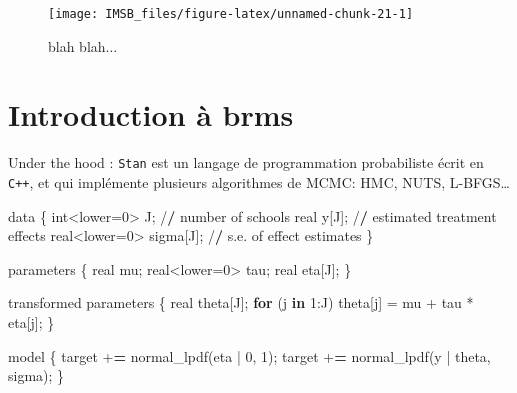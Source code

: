 \documentclass[
  a4paper,11pt,twoside,onecolumn,openright,final,oldfontcommands]{memoir}
\newenvironment{Shaded}{\begin{snugshade}}{\end{snugshade}}
\newcommand{\ControlFlowTok}[1]{\textcolor[rgb]{0.13,0.29,0.53}{\textbf{#1}}}
\newcommand{\DecValTok}[1]{\textcolor[rgb]{0.00,0.00,0.81}{#1}}
\newcommand{\ErrorTok}[1]{\textcolor[rgb]{0.64,0.00,0.00}{\textbf{#1}}}
\newcommand{\FunctionTok}[1]{\textcolor[rgb]{0.00,0.00,0.00}{#1}}
\newcommand{\NormalTok}[1]{#1}
\newcommand{\OtherTok}[1]{\textcolor[rgb]{0.56,0.35,0.01}{#1}}
\newcommand{\SpecialCharTok}[1]{\textcolor[rgb]{0.00,0.00,0.00}{#1}}
\theoremstyle{definition}
\theoremstyle{definition}
\theoremstyle{definition}
\theoremstyle{definition}
\theoremstyle{remark}
\begin{document}
\begin{figure}[!htb]

{\centering \texttt{[image: IMSB\_files/figure-latex/unnamed-chunk-21-1]} 

}

\caption{blah blah...}\label{fig:unnamed-chunk-21}
\end{figure}

\hypertarget{introduction-uxe0-brms}{%
\section{Introduction à brms}\label{introduction-uxe0-brms}}

Under the hood : \texttt{Stan} est un langage de programmation probabiliste écrit en \texttt{C++}, et qui implémente plusieurs algorithmes de MCMC: HMC, NUTS, L-BFGS\ldots{}

\begin{Shaded}
\begin{Highlighting}[]
\NormalTok{data \{}
\NormalTok{  int}\SpecialCharTok{\textless{}}\NormalTok{lower}\OtherTok{=}\DecValTok{0}\SpecialCharTok{\textgreater{}}\NormalTok{ J; }\SpecialCharTok{/}\ErrorTok{/}\NormalTok{ number of schools }
\NormalTok{  real y[J]; }\SpecialCharTok{/}\ErrorTok{/}\NormalTok{ estimated treatment effects}
\NormalTok{  real}\SpecialCharTok{\textless{}}\NormalTok{lower}\OtherTok{=}\DecValTok{0}\SpecialCharTok{\textgreater{}}\NormalTok{ sigma[J]; }\SpecialCharTok{/}\ErrorTok{/}\NormalTok{ s.e. of effect estimates }
\NormalTok{\}}

\NormalTok{parameters \{}
\NormalTok{  real mu; }
\NormalTok{  real}\SpecialCharTok{\textless{}}\NormalTok{lower}\OtherTok{=}\DecValTok{0}\SpecialCharTok{\textgreater{}}\NormalTok{ tau;}
\NormalTok{  real eta[J];}
\NormalTok{\}}

\NormalTok{transformed parameters \{}
\NormalTok{  real theta[J];}
  \ControlFlowTok{for}\NormalTok{ (j }\ControlFlowTok{in} \DecValTok{1}\SpecialCharTok{:}\NormalTok{J)}
\NormalTok{    theta[j] }\OtherTok{=}\NormalTok{ mu }\SpecialCharTok{+}\NormalTok{ tau }\SpecialCharTok{*}\NormalTok{ eta[j];}
\NormalTok{\}}

\NormalTok{model \{}
\NormalTok{  target }\SpecialCharTok{+}\ErrorTok{=} \FunctionTok{normal\_lpdf}\NormalTok{(eta }\SpecialCharTok{|} \DecValTok{0}\NormalTok{, }\DecValTok{1}\NormalTok{);}
\NormalTok{  target }\SpecialCharTok{+}\ErrorTok{=} \FunctionTok{normal\_lpdf}\NormalTok{(y }\SpecialCharTok{|}\NormalTok{ theta, sigma);}
\NormalTok{\}}
\end{Highlighting}
\end{Shaded}
\end{document}
